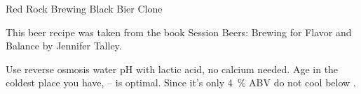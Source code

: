 \begin{recipe}{Red Rock Brewing Black Bier Clone}

\begin{aboutblock}
This beer recipe was taken from the book Session Beers: Brewing for Flavor and
Balance by Jennifer Talley. \sourceaha
\end{aboutblock}


\begin{methodandtiming}
 
\begin{mashsteps}
\end{mashsteps}

\begin{fermentationsteps}
\end{fermentationsteps}

\begin{directions}
Use reverse osmosis water pH with lactic acid, no calcium needed.
Age in the coldest place you have, -- is optimal. Since it's
only 4~\% ABV do not cool below .
\end{directions}

\end{methodandtiming}

\recipebreak

\begin{ingredientsblock}

\begin{malts}
\end{malts}

\begin{hops}
\end{hops}


\end{ingredientsblock}

\end{recipe}
